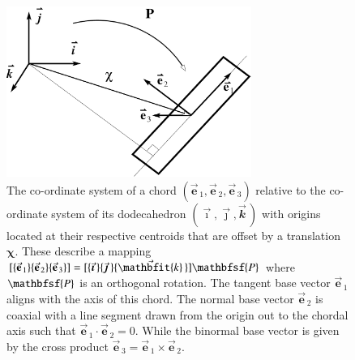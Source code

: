 \begin{figure}
    \centering
    \includegraphics[width=8cm]{figures/chord.pdf}
    \caption{The co-ordinate system of a chord $( \vec{\mathbf{e}}_{\,1} , \vec{\mathbf{e}}_{\,2} , \vec{\mathbf{e}}_{\,3} )$ relative to the co-ordinate system of its dodecahedron $( \vec{\boldsymbol{\imath}} , \vec{\boldsymbol{\jmath}} , \vec{\mathbfit{k}} \,)$ with origins located at their respective centroids that are offset by a translation $\boldsymbol{\chi}$.  These describe a mapping $[ \{ \vec{\mathbf{e}}_{\,1} \} \{ \vec{\mathbf{e}}_{\,2} \} \{ \vec{\mathbf{e}}_{\,3} \} ] = [ \{ \vec{\boldsymbol{\imath}} \, \}\{ \vec{\boldsymbol{\jmath}} \, \}\{ \vec{\mathbfit{k}} \, \} ] \mathbfsf{P}$ where $\mathbfsf{P}$ is an orthogonal rotation.  The tangent base vector $\vec{\mathbf{e}}_{\,1}$ aligns with the axis of this chord. The normal base vector $\vec{\mathbf{e}}_{\,2}$ is coaxial with a line segment drawn from the origin out to the chordal axis such that $\vec{\mathbf{e}}_{\,1} \cdot \vec{\mathbf{e}}_{\,2} = 0$. While the binormal base vector is given by the cross product $\vec{\mathbf{e}}_{\,3} = \vec{\mathbf{e}}_{\,1} \times \vec{\mathbf{e}}_{\,2}$.}
    \label{figchord}
\end{figure}

